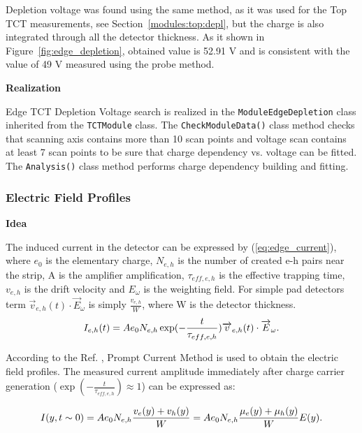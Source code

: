 \documentclass[12pt,oneside,notitlepage,abstracton,a4paper]{scrartcl}
\begin{document}
Depletion voltage was found using the same method, as it was used for the Top TCT measurements, see Section~\ref{modules:top:depl}, but the charge is also integrated through all the detector thickness. As it shown in Figure~\ref{fig:edge_depletion}, obtained value is 52.91 V and is consistent with the value of 49 V measured using the probe method.

\textbf{Realization}

\indent Edge TCT Depletion Voltage search is realized in the \lstinline$ModuleEdgeDepletion$ class inherited from the \lstinline$TCTModule$ class. The \lstinline$CheckModuleData()$ class method checks that scanning axis contains more than 10 scan points and voltage scan contains at least 7 scan points to be sure that charge dependency vs. voltage can be fitted. The \lstinline$Analysis()$ class method performs charge dependency building and fitting.

\subsubsection{Electric Field Profiles}\label{modules:edge:profiles}

\textbf{Idea}

The induced current in the detector can be expressed by (\ref{eq:edge_current}), where $e_0$ is the elementary charge, $N_{e,h}$ is the number of created e-h pairs near the strip, A is the amplifier amplification, $\tau _{eff,e,h}$ is the effective trapping time, $v_{e,h}$ is the drift velocity and $E_\omega$ is the weighting field. For simple pad detectors term $\overrightarrow{v}_{e,h}(t)\cdot\overrightarrow{E}_{\omega}$ is simply $\frac{v_{e,h}}{W}$, where W is the detector thickness.
\begin{equation}
    \centering
    I_{e,h}(t) = Ae_0N_{e,h}\exp(-\frac{t}{\tau _{eff,e,h}})\overrightarrow{v}_{e,h}(t)\cdot\overrightarrow{E}_{\omega}.
    \label{eq:edge_current}
\end{equation}

According to the Ref. \cite{bib:si_study_edge}, Prompt Current Method is used to obtain the electric field profiles. The measured current amplitude immediately after charge carrier generation ($\exp(-\frac{t}{\tau _{eff,e,h}})\approx1$) can be expressed as:

\begin{equation}
    \centering
    I(y,t\sim0) = Ae_0N_{e,h}\frac{v_e(y)+v_h(y)}{W} = Ae_0N_{e,h}\frac{\mu _e(y)+\mu _h(y)}{W}E(y).
    \label{eq:edge_current_1}
\end{equation}
\end{document}
